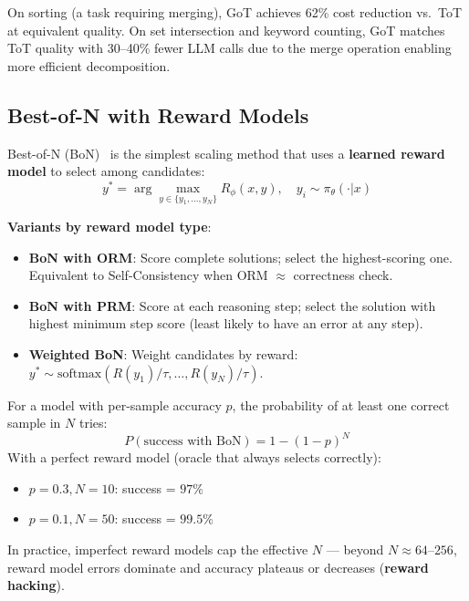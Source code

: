 On sorting (a task requiring merging), GoT achieves 62\% cost reduction vs.~ToT at equivalent quality. On set intersection and keyword counting, GoT matches ToT quality with 30--40\% fewer LLM calls due to the merge operation enabling more efficient decomposition.

\subsection{Best-of-N with Reward Models}
\label{subsec:bon_method}

Best-of-N (BoN)~\cite{nakano2021webgpt, stiennon2020learning} is the simplest scaling method that uses a \textbf{learned reward model} to select among candidates: 
\begin{equation}
y^* = \arg\max_{y \in \{y_1, \ldots, y_N\}} R_\phi(x, y), \quad y_i \sim \pi_\theta(\cdot | x)
\end{equation}

\textbf{Variants by reward model type}:

\begin{itemize}
  \item \textbf{BoN with ORM}: Score complete solutions; select the highest-scoring one. Equivalent to Self-Consistency when ORM $\approx$ correctness check.
  \item \textbf{BoN with PRM}: Score at each reasoning step; select the solution with highest minimum step score (least likely to have an error at any step).
  \item \textbf{Weighted BoN}: Weight candidates by reward: $y^* \sim \text{softmax}(R(y_1)/\tau, \ldots, R(y_N)/\tau)$.
\end{itemize}

\begin{keybox}
For a model with per-sample accuracy $p$, the probability of at least one correct sample in $N$ tries: 
\begin{equation}
P(\text{success with BoN}) = 1 - (1-p)^N
\end{equation}
 With a perfect reward model (oracle that always selects correctly):

\begin{itemize}
  \item $p = 0.3, N = 10$: success = $97\%$
  \item $p = 0.1, N = 50$: success = $99.5\%$
\end{itemize}

In practice, imperfect reward models cap the effective $N$ --- beyond $N \approx 64$--$256$, reward model errors dominate and accuracy plateaus or decreases (\textbf{reward hacking}).
\end{keybox}

